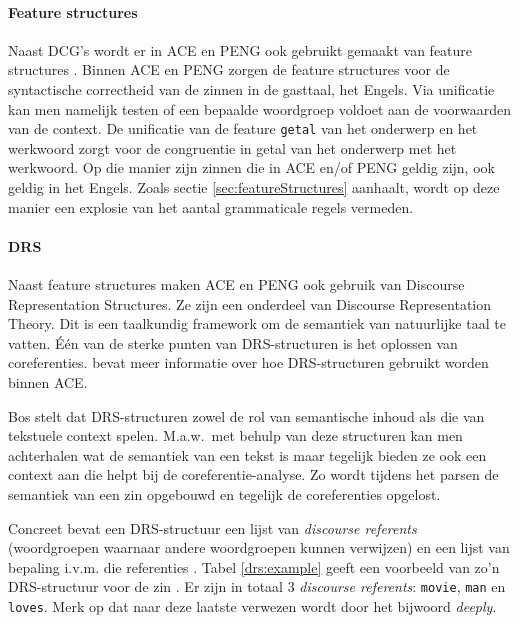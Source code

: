 \paragraph{Feature structures} Naast DCG's wordt er in ACE en PENG ook gebruikt gemaakt van feature structures \cite{Shieber2003, NLPCourse}. Binnen ACE en PENG zorgen de feature structures voor de syntactische correctheid van de zinnen in de gasttaal, het Engels. Via unificatie kan men namelijk testen of een bepaalde woordgroep voldoet aan de voorwaarden van de context. De unificatie van de feature \texttt{getal} van het onderwerp en het werkwoord zorgt voor de congruentie in getal van het onderwerp met het werkwoord. Op die manier zijn zinnen die in ACE en/of PENG geldig zijn, ook geldig in het Engels. Zoals sectie \ref{sec:featureStructures} aanhaalt, wordt op deze manier een explosie van het aantal grammaticale regels vermeden.

\paragraph{DRS} Naast feature structures maken ACE en PENG ook gebruik van Discourse Representation Structures. Ze zijn een onderdeel van Discourse Representation Theory. Dit is een taalkundig framework om de semantiek van natuurlijke taal te vatten. Één van de sterke punten van DRS-structuren is het oplossen van coreferenties. \cite{Fuchs2008drs} bevat meer informatie over hoe DRS-structuren gebruikt worden binnen ACE.

Bos \cite{Bos2011} stelt dat DRS-structuren zowel de rol van semantische inhoud als die van tekstuele context spelen. M.a.w.\ met behulp van deze structuren kan men achterhalen wat de semantiek van een tekst is maar tegelijk bieden ze ook een context aan die helpt bij de coreferentie-analyse. Zo wordt tijdens het parsen de semantiek van een zin opgebouwd en tegelijk de coreferenties opgelost.

Concreet bevat een DRS-structuur een lijst van \textit{discourse referents} (woordgroepen waarnaar andere woordgroepen kunnen verwijzen) en een lijst van bepaling i.v.m. die referenties \cite{Bos2011}. Tabel \ref{drs:example} geeft een voorbeeld van zo'n DRS-structuur voor de zin . Er zijn in totaal 3 \textit{discourse referents}: \texttt{movie}, \texttt{man} en \texttt{loves}. Merk op dat naar deze laatste verwezen wordt door het bijwoord \textit{deeply}.

\begin{savenotes}
\end{savenotes}



